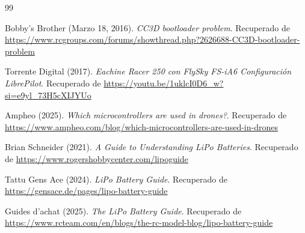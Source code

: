 \documentclass[pdflatex,sn-mathphys-num]{sn-jnl}%
\begin{document}
\begin{thebibliography}{99}

Bobby's Brother (Marzo 18, 2016). \textit{CC3D bootloader problem}. Recuperado de \url{https://www.rcgroups.com/forums/showthread.php?2626688-CC3D-bootloader-problem}

Torrente Digital (2017). \textit{Eachine Racer 250 con FlySky FS-iA6 Configuración LibrePilot}. Recuperado de \url{https://youtu.be/1uklcI0D6_w?si=e9yl_73H5cXIJYUo}

Ampheo (2025). \textit{Which microcontrollers are used in drones?}. Recuperado de \url{https://www.ampheo.com/blog/which-microcontrollers-are-used-in-drones}

Brian Schneider (2021). \textit{A Guide to Understanding LiPo Batteries}. Recuperado de \url{https://www.rogershobbycenter.com/lipoguide}

Tattu Gens Ace (2024). \textit{LiPo Battery Guide}. Recuperado de \url{https://gensace.de/pages/lipo-battery-guide}

Guides d'achat (2025). \textit{The LiPo Battery Guide}. Recuperado de \url{https://www.rcteam.com/en/blogs/the-rc-model-blog/lipo-battery-guide}

\end{thebibliography}
\end{document}

